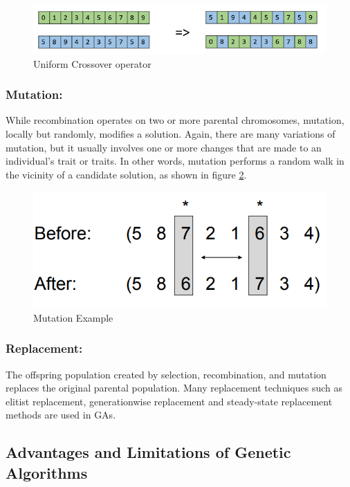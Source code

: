 \begin{figure}[h]
	\centering
	\includegraphics[scale=0.45]{imagenes/uniform_crossover.png}
    \caption{Uniform Crossover operator}
    \label{uniform}
\end{figure}

\subsubsection{Mutation:}
While recombination operates on two or more parental chromosomes,
mutation, locally but randomly, modifies a solution. Again, there are many variations of mutation, but it usually involves one or more changes that are made to
an individual’s trait or traits. In other words, mutation performs a random walk
in the vicinity of a candidate solution, as shown in figure \ref{mutation}.

\begin{figure}[h]
	\centering
	\includegraphics[scale=0.45]{imagenes/mutation.png}
    \caption{Mutation Example}
    \label{mutation}
\end{figure}

\subsubsection{Replacement:}
The offspring population created by selection,
recombination, and mutation replaces the original parental population.
Many replacement techniques such as elitist replacement, generationwise replacement and steady-state replacement methods are used in
GAs.

\subsection{Advantages and Limitations of Genetic Algorithms}
